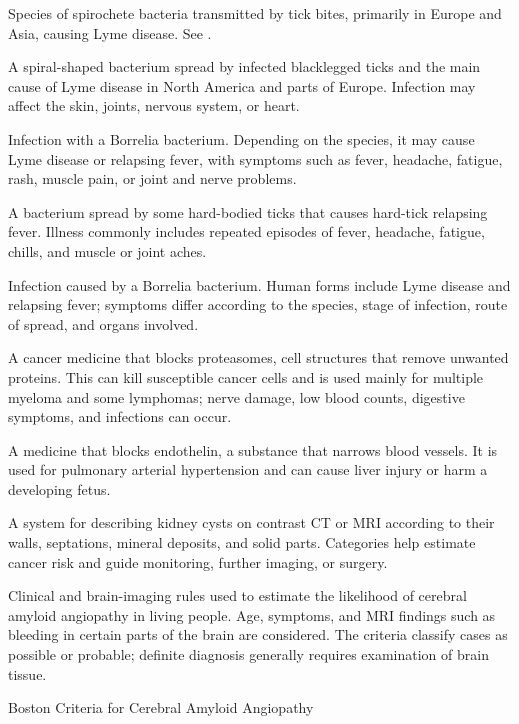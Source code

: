  Species of spirochete bacteria transmitted by tick bites, primarily in Europe and Asia, causing Lyme disease. See .

 A spiral-shaped bacterium spread by infected blacklegged ticks and the main cause of Lyme disease in North America and parts of Europe. Infection may affect the skin, joints, nervous system, or heart.

 Infection with a Borrelia bacterium. Depending on the species, it may cause Lyme disease or relapsing fever, with symptoms such as fever, headache, fatigue, rash, muscle pain, or joint and nerve problems.

 A bacterium spread by some hard-bodied ticks that causes hard-tick relapsing fever. Illness commonly includes repeated episodes of fever, headache, fatigue, chills, and muscle or joint aches.

 Infection caused by a Borrelia bacterium. Human forms include Lyme disease and relapsing fever; symptoms differ according to the species, stage of infection, route of spread, and organs involved.

 A cancer medicine that blocks proteasomes, cell structures that remove unwanted proteins. This can kill susceptible cancer cells and is used mainly for multiple myeloma and some lymphomas; nerve damage, low blood counts, digestive symptoms, and infections can occur.

 A medicine that blocks endothelin, a substance that narrows blood vessels. It is used for pulmonary arterial hypertension and can cause liver injury or harm a developing fetus.

 A system for describing kidney cysts on contrast CT or MRI according to their walls, septations, mineral deposits, and solid parts. Categories help estimate cancer risk and guide monitoring, further imaging, or surgery.

 Clinical and brain-imaging rules used to estimate the likelihood of cerebral amyloid angiopathy in living people. Age, symptoms, and MRI findings such as bleeding in certain parts of the brain are considered. The criteria classify cases as possible or probable; definite diagnosis generally requires examination of brain tissue.

\synonyms
Boston Criteria for Cerebral Amyloid Angiopathy

